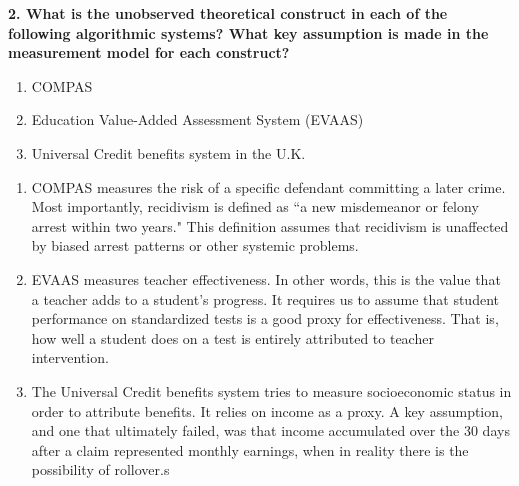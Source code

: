 \documentclass{article}
\begin{document}
\textbf{2. What is the unobserved theoretical construct in each of the following algorithmic systems? What key assumption is made in the measurement model for each construct?}
\begin{enumerate}[label=\Alph*.]
    \item COMPAS
    \item Education Value-Added Assessment System (EVAAS)
    \item Universal Credit benefits system in the U.K.
\end{enumerate}


\bigskip
\begin{mdframed}
\begin{enumerate}[label=\Alph*.]
\item COMPAS measures the risk of a specific defendant committing a later crime. Most importantly, recidivism is defined as ``a new misdemeanor or felony arrest within two years." This definition assumes that recidivism is unaffected by biased arrest patterns or other systemic problems.
\item EVAAS measures teacher effectiveness. In other words, this is the value that a teacher adds to a student's progress. It requires us to assume that student performance on standardized tests is a good proxy for effectiveness. That is, how well a student does on a test is entirely attributed to teacher intervention. 
\item The Universal Credit benefits system tries to measure socioeconomic status in order to attribute benefits. It relies on income as a proxy. A key assumption, and one that ultimately failed, was that income accumulated over the 30 days after a claim represented monthly earnings, when in reality there is the possibility of rollover.s
\end{enumerate}
\end{mdframed}
\bigskip
\end{document}
